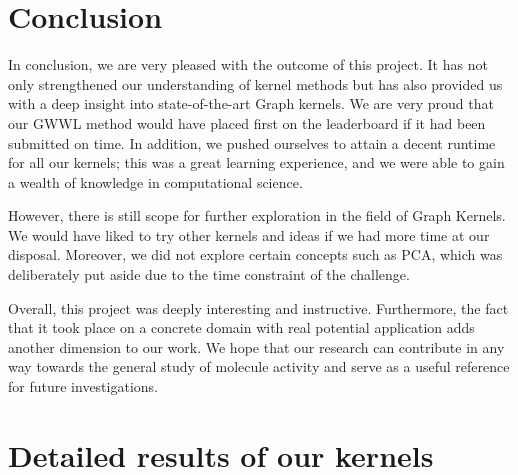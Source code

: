 \documentclass{IEEEtran}
\begin{document}
\section{Conclusion}

In conclusion, we are very pleased with the outcome of this project.
It has not only strengthened our understanding of kernel methods
but has also provided us with a deep insight into state-of-the-art Graph kernels.
We are very proud that our GWWL method would have placed first on the leaderboard if it had been submitted on time.
In addition, we pushed ourselves to attain a decent runtime for all our kernels;
this was a great learning experience, and we were able to gain a wealth of knowledge in computational science.

However, there is still scope for further exploration in the field of Graph Kernels.
We would have liked to try other kernels and ideas if we had more time at our disposal.
Moreover, we did not explore certain concepts such as PCA, which was deliberately put aside due to the time constraint of the challenge.

Overall, this project was deeply interesting and instructive.
Furthermore, the fact that it took place on a concrete domain
with real potential application adds another dimension to our work.
We hope that our research can contribute in any way towards the general study of molecule activity
and serve as a useful reference for future investigations.




\appendix

\section{Detailed results of our kernels} \label{appendix:allresults}
\end{document}
